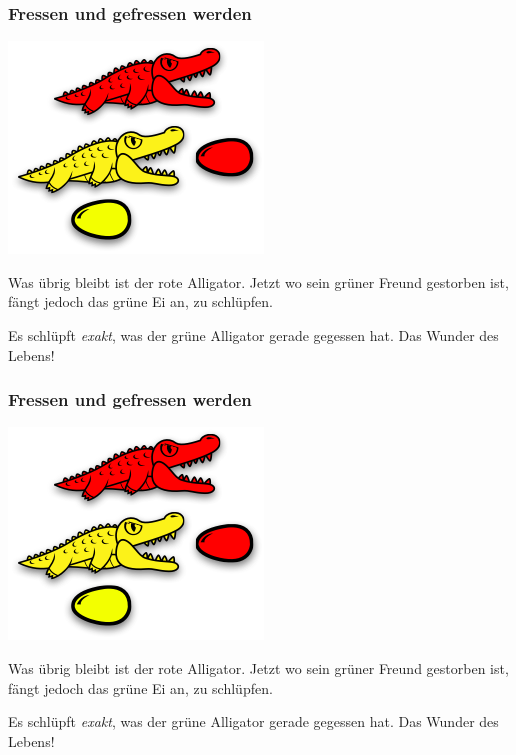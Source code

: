 \documentclass{beamer}
\begin{document}

\begin{frame}
\begin{multicols}{2}
\frametitle{Fressen und gefressen werden}

\begin{center}
\includegraphics[scale=0.45]{eating_6.png} 
\end{center}
\columnbreak

Was übrig bleibt ist der rote Alligator. Jetzt wo sein grüner Freund gestorben ist, fängt jedoch das grüne Ei an, zu schlüpfen.

Es schlüpft \emph{exakt}, was der grüne Alligator gerade gegessen hat. Das Wunder des Lebens!

\end{multicols}
\end{frame}


\begin{frame}
\begin{multicols}{2}
\frametitle{Fressen und gefressen werden}

\begin{center}
\includegraphics[scale=0.45]{eating_6.png} 
\end{center}
\columnbreak

Was übrig bleibt ist der rote Alligator. Jetzt wo sein grüner Freund gestorben ist, fängt jedoch das grüne Ei an, zu schlüpfen.

Es schlüpft \emph{exakt}, was der grüne Alligator gerade gegessen hat. Das Wunder des Lebens!

\end{multicols}
\end{frame}
\end{document}
